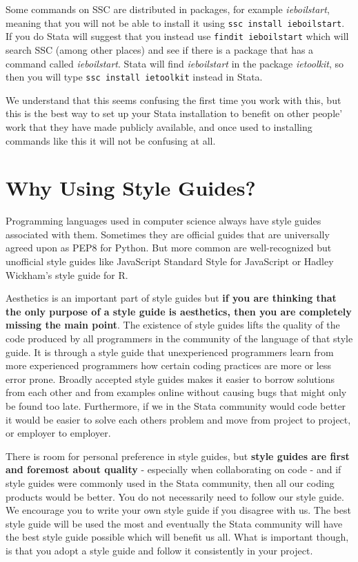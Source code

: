 Some commands on SSC are distributed in packages, for example \textit{ieboilstart}, meaning that you will 
not be able to install it using \verb+ssc install ieboilstart+. If you do Stata will suggest that you 
instead use \verb+findit ieboilstart+ which will search SSC (among other places) and see if there is a 
package that has a command called \textit{ieboilstart}. Stata will find \textit{ieboilstart} in the package 
\textit{ietoolkit}, so then you will type \verb+ssc install ietoolkit+ instead in Stata.

We understand that this seems confusing the first time you work with this, but this is the best way to set 
up your Stata installation to benefit on other people' work that they have made publicly available, and 
once used to installing commands like this it will not be confusing at all.

\section{Why Using Style Guides?}

Programming languages used in computer science always have style guides associated with them. Sometimes 
they are official guides that are universally agreed upon as PEP8 for 
Python. But more common are well-recognized but 
unofficial style guides like JavaScript Standard Style for 
JavaScript or Hadley Wickham's style guide for R.

Aesthetics is an important part of style guides but \textbf{if you are thinking that the only purpose of a 
style guide is aesthetics, then you are completely missing the main point}. The existence of style guides 
lifts the quality of the code produced by all programmers in the community of the language of that style 
guide. It is through a style guide that unexperienced programmers learn from more experienced programmers 
how certain coding practices are more or less error prone. Broadly accepted style guides makes it easier to 
borrow solutions from each other and from examples online without causing bugs that might only be found too 
late. Furthermore, if we in the Stata community would code better it would be easier to solve each others 
problem and move from project to project, or employer to employer.

There is room for personal preference in style guides, but \textbf{style guides are first and foremost 
about quality} - especially when collaborating on code - and if style guides were commonly used in the 
Stata community, then all our coding products would be better. You do not necessarily need to follow our 
style guide. We encourage you to write your own style guide if you disagree with us. The best style guide 
will be used the most and eventually the Stata community will have the best style guide possible which will 
benefit us all. What is important though, is that you adopt a style guide and follow it consistently in 
your project.



\mainmatter
